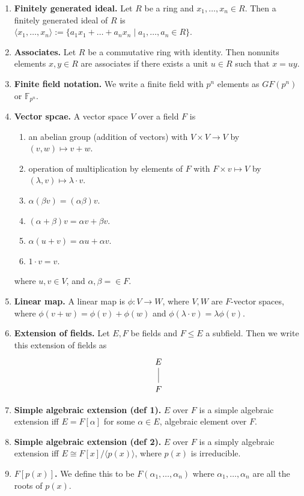 \begin{enumerate}
	\item \textbf{Finitely generated ideal. } Let $R$ be a ring and $x_1,\dots,x_n \in R$. Then a finitely generated ideal of $R$ is $\langle x_1,\dots,x_n \rangle := \{a_1x_1 + \dots + a_nx_n \mid a_1,\dots,a_n \in R\}$. 
	\item \textbf{Associates. } Let $R$ be a commutative ring with identity. Then nonunits elements $x,y \in R$ are associates if there exists a unit $u \in R$ such that $x=uy$. 
	\item \textbf{Finite field notation. } We write a finite field with $p^n$ elements as $GF(p^n)$ or $\mathbb{F}_{p^n}$. 
	\item \textbf{Vector spcae. } A vector space $V$ over a field $F$ is 
	\begin{enumerate}
		\item an abelian group (addition of vectors) with $V \times V \to V$ by $(v,w) \mapsto v+w$. 
		\item operation of multiplication by elements of $F$ with $F \times v \mapsto V$ by $(\lambda,v) \mapsto \lambda \cdot v$. 
		\item $\alpha(\beta v) = (\alpha\beta)v$. 
		\item $(\alpha + \beta)v = \alpha v + \beta v$. 
		\item $\alpha(u+v) = \alpha u + \alpha v$. 
		\item $1 \cdot v = v$. 
	\end{enumerate}
	where $u,v \in V$, and $\alpha,\beta = \in F$. 
	\item \textbf{Linear map. } A linear map is $\phi: V \to W$, where $V,W$ are $F$-vector spaces, where $\phi(v+w) = \phi(v) + \phi(w)$ and $\phi(\lambda \cdot v) = \lambda\phi(v)$. 
	\item \textbf{Extension of fields. } Let $E,F$ be fields and $F \leq E$ a subfield. Then we write this extension of fields as 
	$$
	\begin{tikzcd}
	E \arrow [d,-] \\
	F
	\end{tikzcd}
	$$
	\item \textbf{Simple algebraic extension (def 1). } $E$ over $F$ is a simple algebraic extension iff $E = F[\alpha]$ for some $\alpha \in E$, algebraic element over $F$. 
	\item \textbf{Simple algebraic extension (def 2). } $E$ over $F$ is a simply algebraic extension iff $E \cong F[x] / \langle p(x) \rangle$, where $p(x)$ is irreducible. 
	\item \textbf{$F[p(x)]$. } We define this to be $F(\alpha_1,\dots,\alpha_n)$ where $\alpha_1,\dots,\alpha_n$ are all the roots of $p(x)$. 

\end{enumerate}
